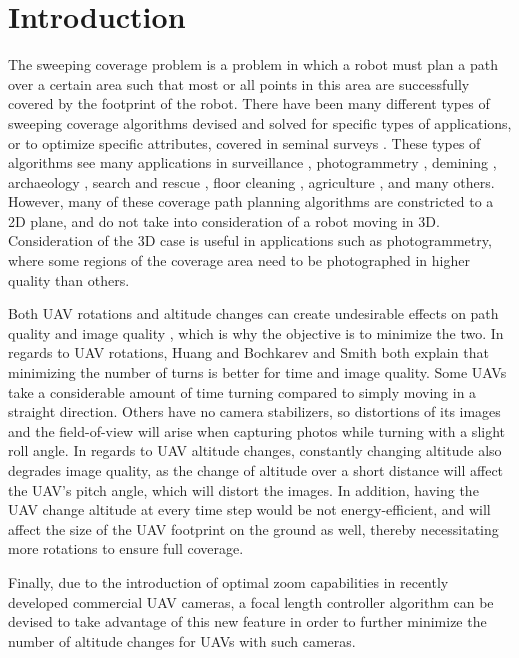 \documentclass[conference]{IEEEtran}
\theoremstyle{plain}%
\begin{document}
\section{Introduction}
The sweeping coverage problem is a problem in which a robot must plan a path over a certain area such that most or all points in this area are successfully covered by the footprint of the robot. There have been many different types of sweeping coverage algorithms devised and solved for specific types of applications, or to optimize specific attributes, covered in seminal surveys \cite{choset2001coverage} \cite{galceran2013survey}. These types of algorithms see many applications in surveillance \cite{ahmadzadeh2008optimization}, photogrammetry \cite{di2016coverage}, demining \cite{acar2003path}, archaeology \cite{galceran2015coverage}, search and rescue \cite{lin2009uav}, floor cleaning \cite{hess2014probabilistic}, agriculture \cite{hameed2013optimized}, and many others. However, many of these coverage path planning algorithms are constricted to a 2D plane, and do not take into consideration of a robot moving in 3D. Consideration of the 3D case is useful in applications such as photogrammetry, where some regions of the coverage area need to be photographed in higher quality than others.

Both UAV rotations and altitude changes can create undesirable effects on path quality \cite{huang2001optimal} and image quality \cite{frew2004vision}, which is why the objective is to minimize the two. In regards to UAV rotations, Huang \cite{huang2001optimal} and Bochkarev and Smith \cite{bochkarevminimizing} both explain that minimizing the number of turns is better for time and image quality. Some UAVs take a considerable amount of time turning compared to simply moving in a straight direction. Others have no camera stabilizers, so distortions of its images and the field-of-view will arise when capturing photos while turning with a slight roll angle. In regards to UAV altitude changes, constantly changing altitude also degrades image quality, as the change of altitude over a short distance will affect the UAV's pitch angle, which will distort the images. In addition, having the UAV change altitude at every time step would be not energy-efficient, and will affect the size of the UAV footprint on the ground as well, thereby necessitating more rotations to ensure full coverage.

Finally, due to the introduction of optimal zoom capabilities in recently developed commercial UAV cameras, a focal length controller algorithm can be devised to take advantage of this new feature in order to further minimize the number of altitude changes for UAVs with such cameras.
\end{document}
